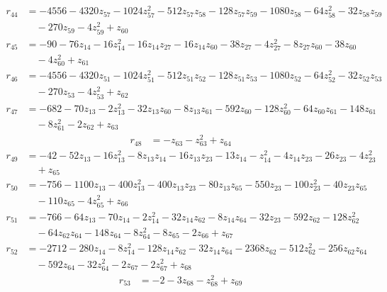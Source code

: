 \begin{align*}
r_{44} &=-4556-4320z_{57}-1024z_{57}^{2}-512z_{57}z_{58}-128z_{57}z_{59}-1080z_{58}-64z_{58}^{2}-32z_{58}z_{59}\\
&\quad -270z_{59}-4z_{59}^{2}+z_{60}
\end{align*}
\begin{align*}
r_{45} &=-90-76z_{14}-16z_{14}^{2}-16z_{14}z_{27}-16z_{14}z_{60}-38z_{27}-4z_{27}^{2}-8z_{27}z_{60}-38z_{60}\\
&\quad -4z_{60}^{2}+z_{61}
\end{align*}
\begin{align*}
r_{46} &=-4556-4320z_{51}-1024z_{51}^{2}-512z_{51}z_{52}-128z_{51}z_{53}-1080z_{52}-64z_{52}^{2}-32z_{52}z_{53}\\
&\quad -270z_{53}-4z_{53}^{2}+z_{62}
\end{align*}
\begin{align*}
r_{47} &=-682-70z_{13}-2z_{13}^{2}-32z_{13}z_{60}-8z_{13}z_{61}-592z_{60}-128z_{60}^{2}-64z_{60}z_{61}-148z_{61}\\
&\quad -8z_{61}^{2}-2z_{62}+z_{63}
\end{align*}
\begin{align*}
r_{48} &=-z_{63}-z_{63}^{2}+z_{64}
\end{align*}
\begin{align*}
r_{49} &=-42-52z_{13}-16z_{13}^{2}-8z_{13}z_{14}-16z_{13}z_{23}-13z_{14}-z_{14}^{2}-4z_{14}z_{23}-26z_{23}-4z_{23}^{2}\\
&\quad +z_{65}
\end{align*}
\begin{align*}
r_{50} &=-756-1100z_{13}-400z_{13}^{2}-400z_{13}z_{23}-80z_{13}z_{65}-550z_{23}-100z_{23}^{2}-40z_{23}z_{65}\\
&\quad -110z_{65}-4z_{65}^{2}+z_{66}
\end{align*}
\begin{align*}
r_{51} &=-766-64z_{13}-70z_{14}-2z_{14}^{2}-32z_{14}z_{62}-8z_{14}z_{64}-32z_{23}-592z_{62}-128z_{62}^{2}\\
&\quad -64z_{62}z_{64}-148z_{64}-8z_{64}^{2}-8z_{65}-2z_{66}+z_{67}
\end{align*}
\begin{align*}
r_{52} &=-2712-280z_{14}-8z_{14}^{2}-128z_{14}z_{62}-32z_{14}z_{64}-2368z_{62}-512z_{62}^{2}-256z_{62}z_{64}\\
&\quad -592z_{64}-32z_{64}^{2}-2z_{67}-2z_{67}^{2}+z_{68}
\end{align*}
\begin{align*}
r_{53} &=-2-3z_{68}-z_{68}^{2}+z_{69}
\end{align*}
